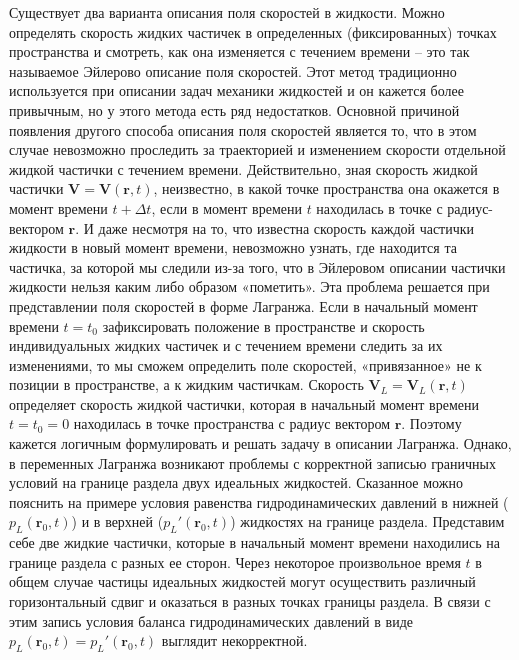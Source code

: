 Существует два варианта описания поля скоростей в жидкости. Можно определять скорость жидких частичек в определенных (фиксированных) точках пространства и смотреть, как она изменяется с течением времени – это так называемое Эйлерово описание поля скоростей. Этот метод традиционно используется при описании задач механики жидкостей и он кажется более привычным, но у этого метода есть ряд недостатков. Основной причиной появления другого способа описания поля скоростей является то, что в этом случае невозможно проследить за траекторией и изменением скорости отдельной жидкой частички с течением времени. Действительно, зная скорость жидкой частички $ \mathbf{V}=\mathbf{V}\left( \mathbf{r}, t \right) $, неизвестно, в какой точке пространства она окажется в момент времени $ t+\Delta t $, если в момент времени $ t $ находилась в точке с радиус-вектором $ \mathbf{r} $. И даже несмотря на то, что известна скорость каждой частички жидкости в новый момент времени, невозможно узнать, где находится та частичка, за которой мы следили из-за того, что в Эйлеровом описании частички жидкости нельзя каким либо образом «пометить». Эта проблема решается при представлении поля скоростей в форме Лагранжа. Если в начальный момент времени $ t=t_{0} $ зафиксировать положение в пространстве и скорость индивидуальных жидких частичек и с течением времени следить за их изменениями, то мы сможем определить поле скоростей, «привязанное» не к позиции в пространстве, а к жидким частичкам. Скорость $ \mathbf{V}_{L}=\mathbf{V}_{L} \left( \mathbf{r}, t\right) $ определяет скорость жидкой частички, которая в начальный момент времени $ t=t_{0}=0 $ находилась в точке пространства с радиус вектором $ \mathbf{r} $. Поэтому кажется логичным формулировать и решать задачу в описании Лагранжа. Однако, в переменных Лагранжа возникают проблемы с корректной записью граничных условий на границе раздела двух идеальных жидкостей. Сказанное можно пояснить на примере условия равенства гидродинамических давлений в нижней ($ p_{L} \left( \mathbf{r}_{0}, t \right) $) и в верхней ($ p_{L}' \left( \mathbf{r}_{0}, t \right) $) жидкостях на границе раздела. Представим себе две жидкие частички, которые в начальный момент времени находились на границе раздела с разных ее сторон. Через некоторое произвольное время $ t $ в общем случае частицы идеальных жидкостей могут осуществить различный горизонтальный сдвиг и оказаться в разных точках границы раздела. В связи с этим запись условия баланса гидродинамических давлений в виде $ p_{L} \left( \mathbf{r}_{0}, t \right) =  p_{L}' \left( \mathbf{r}_{0}, t \right)  $ выглядит некорректной. 

